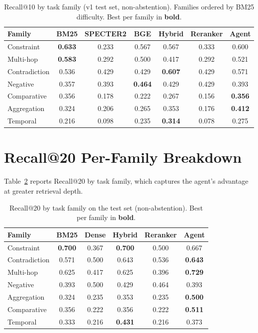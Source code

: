 \documentclass{article}
\begin{document}
\begin{table}[ht]
\centering
\caption{Recall@10 by task family (v1 test set, non-abstention). Families ordered by BM25 difficulty. Best per family in \textbf{bold}.}
\label{tab:perfamily}
\small
\begin{tabular}{lcccccc}
\toprule
\textbf{Family} & \textbf{BM25} & \textbf{SPECTER2} & \textbf{BGE} & \textbf{Hybrid} & \textbf{Reranker} & \textbf{Agent} \\
\midrule
Constraint     & \textbf{0.633} & 0.233 & 0.567 & 0.567 & 0.333 & 0.600 \\
Multi-hop      & \textbf{0.583} & 0.292 & 0.500 & 0.417 & 0.292 & 0.521 \\
Contradiction  & 0.536 & 0.429 & 0.429 & \textbf{0.607} & 0.429 & 0.571 \\
Negative       & 0.357 & 0.393 & \textbf{0.464} & 0.429 & 0.429 & 0.393 \\
Comparative    & 0.356 & 0.178 & 0.222 & 0.267 & 0.156 & \textbf{0.356} \\
Aggregation    & 0.324 & 0.206 & 0.265 & 0.353 & 0.176 & \textbf{0.412} \\
Temporal       & 0.216 & 0.098 & 0.235 & \textbf{0.314} & 0.078 & 0.275 \\
\bottomrule
\end{tabular}
\end{table}

\section{Recall@20 Per-Family Breakdown}
\label{app:recall20}

Table~\ref{tab:perfamily20} reports Recall@20 by task family, which captures the agent's advantage at greater retrieval depth.

\begin{table}[ht]
\centering
\caption{Recall@20 by task family on the test set (non-abstention). Best per family in \textbf{bold}.}
\label{tab:perfamily20}
\small
\begin{tabular}{lccccc}
\toprule
\textbf{Family} & \textbf{BM25} & \textbf{Dense} & \textbf{Hybrid} & \textbf{Reranker} & \textbf{Agent} \\
\midrule
Constraint & \textbf{0.700} & 0.367 & \textbf{0.700} & 0.500 & 0.667 \\
Contradiction & 0.571 & 0.500 & 0.643 & 0.536 & \textbf{0.643} \\
Multi-hop & 0.625 & 0.417 & 0.625 & 0.396 & \textbf{0.729} \\
Negative & 0.393 & 0.500 & 0.429 & 0.464 & 0.393 \\
Aggregation & 0.324 & 0.235 & 0.353 & 0.235 & \textbf{0.500} \\
Comparative & 0.356 & 0.222 & 0.356 & 0.222 & \textbf{0.511} \\
Temporal & 0.333 & 0.216 & \textbf{0.431} & 0.216 & 0.373 \\
\bottomrule
\end{tabular}
\end{table}
\end{document}
